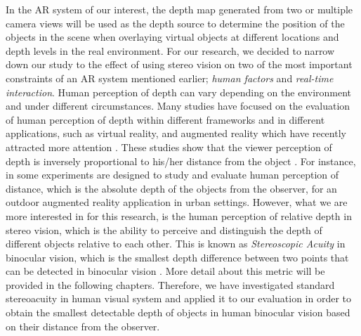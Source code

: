In the AR system of our interest, the depth map generated from two or multiple camera views will be used as the depth source to determine the position of the objects in the scene when
overlaying virtual objects at different locations and depth levels in the real environment. For our research, we decided to narrow down our study to the effect of using stereo vision
on two of the most important constraints of an AR system mentioned earlier; {\it human factors} and {\it real-time interaction}. {\newline}
Human perception of depth can vary depending on the environment and under different circumstances. Many studies have focused on the evaluation of human perception of depth within different frameworks
and in different applications, such as virtual reality, and augmented reality which have recently attracted more attention \cite{wann95,dras96,liv05,jer05,swa07,kru10}.
These studies show that the viewer perception of depth
is inversely proportional to his/her distance from the object \cite{kru10,swa07,jer05,liv05}. For instance, in \cite{swa07} some experiments are designed to study and evaluate human
perception of distance, which is the absolute depth of the objects from the observer, for an outdoor augmented reality application in urban settings. 
However, what we are more interested in for this research, is the human perception of relative depth in stereo vision, which is the ability to perceive and distinguish 
the depth of different objects relative to each other. This is known as {\it Stereoscopic Acuity} in binocular vision, which is the smallest depth difference between two points 
that can be detected in binocular vision \cite{pfa2000}. More detail about
this metric will be provided in the following chapters.
Therefore, we have investigated standard stereoacuity in human visual system and applied it to our evaluation in order to obtain the smallest detectable depth of 
objects in human binocular vision based on their distance from the observer.

